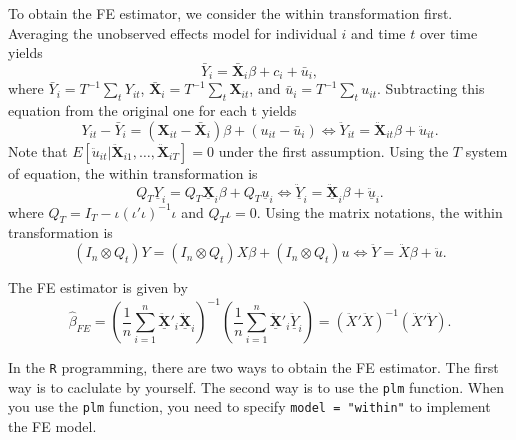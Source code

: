 \documentclass[
  12pt,
]{article}
\begin{document}
To obtain the FE estimator, we consider the within transformation first.
Averaging the unobserved effects model for individual \(i\) and time
\(t\) over time yields \[
  \bar{Y}_i = \bar{\mathbf{X}}_i \beta + c_i + \bar{u}_i,
\] where \(\bar{Y}_i = T^{-1} \sum_t Y_{it}\),
\(\bar{\mathbf{X}}_i = T^{-1} \sum_t \mathbf{X}_{it}\), and
\(\bar{u}_i = T^{-1} \sum_t u_{it}\). Subtracting this equation from the
original one for each t yields \[
  Y_{it} - \bar{Y}_i = (\mathbf{X}_{it} - \bar{\mathbf{X}}_i) \beta + (u_{it} - \bar{u}_i)
  \Leftrightarrow
  \ddot{Y}_{it} = \ddot{\mathbf{X}}_{it} \beta + \ddot{u}_{it}.
\] Note that
\(E[\ddot{u}_{it} | \ddot{\mathbf{X}}_{i1}, \ldots, \ddot{\mathbf{X}}_{iT}] = 0\)
under the first assumption. Using the \(T\) system of equation, the
within transformation is \[
  Q_T \underline{Y}_i = Q_T \underline{\mathbf{X}}_i \beta + Q_T \underline{u}_i
  \Leftrightarrow
  \ddot{\underline{Y}}_i = \ddot{\underline{\mathbf{X}}}_i \beta + \ddot{\underline{u}}_i.
\] where \(Q_T = I_T - \iota (\iota' \iota)^{-1} \iota\) and
\(Q_T \iota = 0\). Using the matrix notations, the within transformation
is \[
  (I_n \otimes Q_t) Y = (I_n \otimes Q_t) X \beta + (I_n \otimes Q_t) u
  \Leftrightarrow
  \ddot{Y} = \ddot{X} \beta + \ddot{u}.
\]

The FE estimator is given by \[
  \hat{\beta}_{FE} = 
  \left( \frac{1}{n} \sum_{i=1}^n \ddot{\underline{\mathbf{X}}}'_i 
  \ddot{\underline{\mathbf{X}}}_i \right)^{-1}
  \left( \frac{1}{n} \sum_{i=1}^n \ddot{\underline{\mathbf{X}}}'_i \ddot{\underline{Y}}_i \right)
  = (\ddot{X}' \ddot{X})^{-1}(\ddot{X}' \ddot{Y}).
\]

In the \texttt{R} programming, there are two ways to obtain the FE
estimator. The first way is to caclulate by yourself. The second way is
to use the \texttt{plm} function. When you use the \texttt{plm}
function, you need to specify \texttt{model\ =\ "within"} to implement
the FE model.
\end{document}

